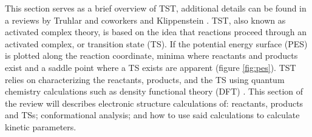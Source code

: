 \documentclass[preprint, 11pt]{elsarticle} %
\begin{document}
This section serves as a brief overview of TST, additional details can be found in a reviews by Truhlar and coworkers \cite{truhlar:1996} and Klippenstein \cite{Klippenstein:2017eu}.
TST, also known as activated complex theory, is based on the idea that reactions proceed through an activated complex, or transition state (TS).
If the potential energy surface (PES) is plotted along the reaction coordinate, minima where reactants and products exist and a saddle point where a TS exists are apparent (figure \ref{fig:pes}). 
TST relies on characterizing the reactants, products, and the TS using quantum chemistry calculations such as density functional theory (DFT) \cite{DFT:1964}.
This section of the review will describes electronic structure calculations of: reactants, products and TSs; conformational analysis; and how to use said calculations to calculate kinetic parameters.
\end{document}
